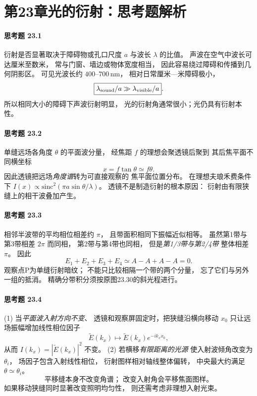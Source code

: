 \section*{第23章\quad 光的衍射：思考题解析}
\paragraph{思考题 23.1}
衍射是否显著取决于障碍物或孔口尺度 \(a\)
与波长 \(\lambda\) 的比值。
声波在空气中波长可达厘米至数米，
常与门窗、墙边或物体宽度相当，
因此容易绕过障碍和传播到几何阴影区。
可见光波长约 \(400\)--\(700\,\mathrm{nm}\)，
相对日常厘米—米障碍极小，
\[
\boxed{\lambda_{\rm sound}/a
\gg \lambda_{\rm visible}/a}.
\]
所以相同大小的障碍下声波衍射明显，
光的衍射角通常很小；光仍具有衍射本性。

\paragraph{思考题 23.2}
单缝远场各角度 \(\theta\) 的平面波分量，
经焦距 \(f\) 的理想会聚透镜后聚到
其后焦平面不同横坐标
\[
\boxed{x=f\tan\theta\simeq f\theta}.
\]
因此透镜把远场\emph{角度谱}转为可直接观察的
焦平面位置分布。
在理想夫琅禾费条件下
\(I(x)\propto\mathrm{sinc}^2(\pi a\sin\theta/\lambda)\)。
透镜不是制造衍射的根本原因：
衍射由有限狭缝上的相干波叠加产生。

\paragraph{思考题 23.3}
相邻半波带的平均相位相差约 \(\pi\)，
且带面积相同下振幅近似相等。
虽然第1带与第3带相差 \(2\pi\) 而同相，
第2带与第4带也同相，
但是\emph{第1/3带与第2/4带}
整体相差 \(\pi\)。
因此
\[
\boxed{E_1+E_2+E_3+E_4
\simeq A-A+A-A=0}.
\]
观察点P为单缝衍射暗纹；
不能只比较相隔一个带的两个分量，
忘了它们与另外一组的抵消。
精确分带积分须按原图23.30的斜光程进行。

\paragraph{思考题 23.4}
(1) 当\emph{平面波入射方向不变}、
透镜和观察屏固定时，把狭缝沿横向移动
\(x_0\) 只让远场振幅增加线性相位因子
\[
\tilde E(k_x)\mapsto
\tilde E(k_x)e^{-ik_xx_0},
\]
从而
\(\boxed{I(k_x)=|\tilde E(k_x)|^2\text{ 不变}}\)。
(2) 若横移\emph{有限距离的光源}
使入射波倾角改变为 \(\theta_i\)，
场因子包含入射线性相位，
衍射图样相对轴线整体偏转，
中央最大约满足
\(\theta\simeq\theta_i\)。
\[
\boxed{\text{平移缝本身不改变角谱；
改变入射角会平移焦面图样。}}
\]
如果移动狭缝同时显著改变照明均匀性，
则还需考虑非理想入射光束。

